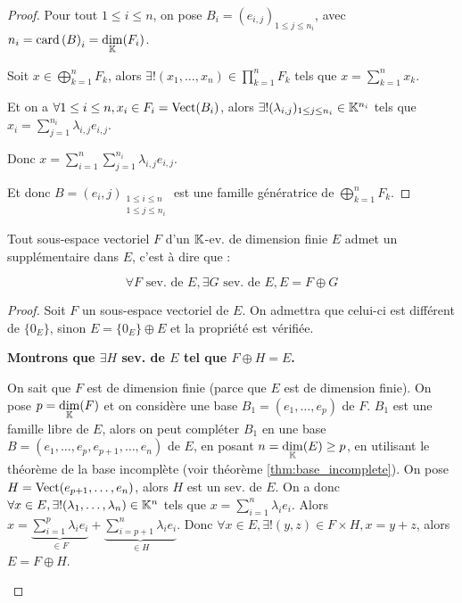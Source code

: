\documentclass[12pt,a4paper]{report}
\begin{document}
\begin{proof}
    Pour tout $1 \le i \le n$, on pose $B_i = (e_{i,j})_{1 \le j \le n_i}$, avec $n_i = \mathrm{card}\left(B\right)_i = \underset{\mathbb{K}}\dim(F_i)$.

    Soit $x \in \bigoplus_{k=1}^n F_k$, alors $\exists ! (x_1,\dots,x_n) \in \prod_{k=1}^n F_k$ tels que $x = \sum_{k=1}^n x_k$.

    Et on a $\forall 1 \le i \le n, x_i \in F_i = \mathrm{Vect}(B_i)$, alors $\exists ! (\lambda_{i,j})_{1 \le j \le n_i} \in \mathbb{K}^{n_i}$ tels que $x_i = \sum_{j=1}^{n_i} \lambda_{i,j} e_{i,j}$.

    Donc $x = \sum_{i=1}^n\sum_{j=1}^{n_i} \lambda_{i,j} e_{i,j}$.

    Et donc $B = (e_i,j)_{\substack{1 \le i \le n \\ 1 \le j \le n_i}}$ est une famille génératrice de $\bigoplus_{k=1}^n F_k$.
\end{proof}

\begin{theorem}[Lemme]
    Tout sous-espace vectoriel $F$ d'un $\mathbb{K}$-ev. de dimension finie $E$ admet un supplémentaire dans $E$, c'est à dire que :

    $$\forall F \text{ sev. de } E, \exists G \text{ sev. de } E, E = F \oplus G$$
    \label{lem:sous_espace_vectoriel_admet_suppl}
\end{theorem}

\begin{proof}
    Soit $F$ un sous-espace vectoriel de $E$. On admettra que celui-ci est différent de $\{0_E\}$, sinon $E = \{0_E\} \oplus E$ et la propriété est vérifiée.

    \textbf{Montrons que $\exists H$ sev. de $E$ tel que $F \oplus H = E$.}

    \begin{outline}
        \1 On sait que $F$ est de dimension finie (parce que $E$ est de dimension finie). On pose $p = \underset{\mathbb{K}}\dim(F)$ et on considère une base $B_1 = (e_1,\dots,e_p)$ de $F$.
        \1 $B_1$ est une famille libre de $E$, alors on peut compléter $B_1$ en une base $B = (e_1,\dots,e_p,e_{p+1},\dots,e_n)$ de $E$, en posant $n = \underset{\mathbb{K}}\dim(E) \ge p$, en utilisant le théorème de la base incomplète (voir théorème \ref{thm:base_incomplete}).
        \1 On pose $H = \mathrm{Vect}(e_{p+1},\dots,e_n)$, alors $H$ est un sev. de $E$.
        \1 On a donc $\forall x \in E, \exists ! (\lambda_1,\dots,\lambda_n) \in \mathbb{K}^n$ tels que $x = \sum_{i=1}^n \lambda_i e_i$.
        \1 Alors $x = \underbrace{\sum_{i=1}^p \lambda_i e_i}_{\in F} + \underbrace{\sum_{i=p+1}^n \lambda_i e_i}_{\in H}$.
        \1 Donc $\forall x \in E, \exists ! (y,z) \in F\times H, x = y+z$, alors $E = F \oplus H$.
    \end{outline}
\end{proof}
\end{document}
